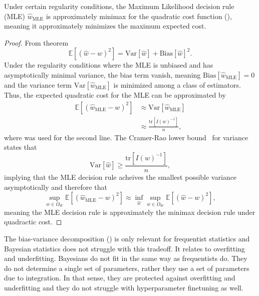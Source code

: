\begin{corollary}
	\label{cor:MLE_minimax}
	Under certain regularity conditions, the Maximum Likelihood decision rule (MLE) $\hat{w}_{\text{MLE}}$ is approximately minimax for the quadratic cost function (), meaning it approximately minimizes the maximum expected cost.
	
	\begin{proof}
		From theorem 
		\begin{equation}
			\mathbb{E}[(\hat{w}-w)^2] = \text{Var}[\hat{w}]+\text{Bias}[\hat{w}]^2.
		\end{equation}
		Under the regularity conditions where the MLE is unbiased and has asymptotically minimal variance, the bias term vanish, meaning $\text{Bias}[\hat{w}_{\text{MLE}}] = 0$ and the variance term $\text{Var}[\hat{w}_{\text{MLE}}]$ is minimized among a class of estimators. Thus, the expected quadratic cost for the MLE can be approximated by
		\begin{equation}
			\begin{split}
				\mathbb{E}[(\hat{w}_{\text{MLE}}-w)^2] &\approx \text{Var}[\hat{w}_{\text{MLE}}]\\
				&\approx \frac{\text{tr}[I(w)^{-1}]}{n},
			\end{split}
		\end{equation}
		where  was used for the second line. The Cramer-Rao lower bound~\citep{Rao1973Linear} for variance states that 
		\begin{equation}
			\text{Var}[\hat{w}]\geq \frac{\text{tr}[I(w)^{-1}]}{n},
		\end{equation}
		implying that the MLE decision rule acheives the smallest possible variance asymptotically and therefore that 
		\begin{equation}
			\sup_{w\in \Omega_W}\mathbb{E}[(\hat{w}_{\text{MLE}}-w)^2]\approx \inf_{\hat{w}} \sup_{w \in \Omega_W} \mathbb{E}[(\hat{w} - w)^2],
		\end{equation}
		meaning the MLE decision rule is approximately the minimax decision rule under quadractic cost.
	\end{proof}
\end{corollary}

\begin{example}
	The bias-variance decomposition () is only relevant for frequentist statistics and Bayesian statistics does not struggle with this tradeoff. It relates to overfitting and underfitting. Bayesians do not fit in the same way as frequentists do. They do not determine a single set of parameters, rather they use a set of parameters due to integration. In that sense, they are protected against overfitting and underfitting and they do not struggle with hyperparameter finetuning as well.
\end{example}

